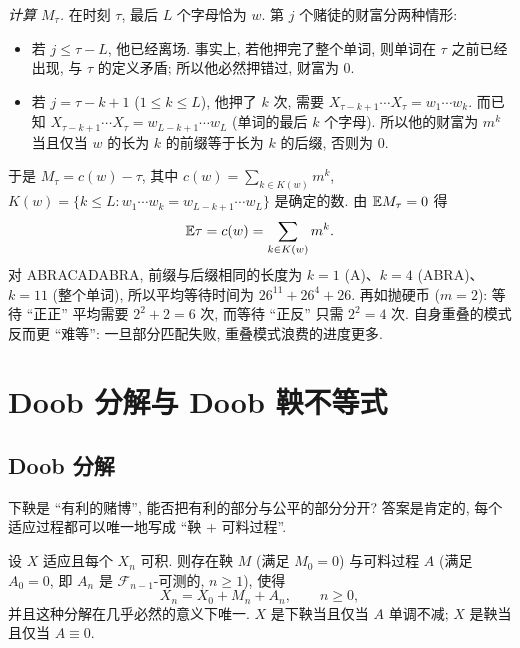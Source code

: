 \begin{example}[ABRACADABRA]
\emph{计算 $M_\tau$.} 在时刻 $\tau$, 最后 $L$ 个字母恰为 $w$. 第 $j$ 个赌徒的财富分两种情形:
\begin{itemize}
\item 若 $j\le\tau-L$, 他已经离场. 事实上, 若他押完了整个单词, 则单词在 $\tau$ 之前已经出现, 与 $\tau$ 的定义矛盾; 所以他必然押错过, 财富为 $0$.
\item 若 $j=\tau-k+1$ ($1\le k\le L$), 他押了 $k$ 次, 需要 $X_{\tau-k+1}\cdots X_\tau=w_1\cdots w_k$. 而已知 $X_{\tau-k+1}\cdots X_\tau=w_{L-k+1}\cdots w_L$ (单词的最后 $k$ 个字母). 所以他的财富为 $m^k$ 当且仅当 $w$ 的长为 $k$ 的前缀等于长为 $k$ 的后缀, 否则为 $0$.
\end{itemize}
于是 $M_\tau=c(w)-\tau$, 其中 $c(w)=\sum_{k\in K(w)}m^k$, $K(w)=\{k\le L: w_1\cdots w_k=w_{L-k+1}\cdots w_L\}$ 是确定的数. 由 $\mathbb{E} M_\tau=0$ 得
\[
\mathbb{E}\tau=c(w)=\sum_{k\in K(w)}m^k.
\]
对 ABRACADABRA, 前缀与后缀相同的长度为 $k=1$ (A)、$k=4$ (ABRA)、$k=11$ (整个单词), 所以平均等待时间为 $26^{11}+26^4+26$. 再如抛硬币 ($m=2$): 等待 ``正正'' 平均需要 $2^2+2=6$ 次, 而等待 ``正反'' 只需 $2^2=4$ 次. 自身重叠的模式反而更 ``难等'': 一旦部分匹配失败, 重叠模式浪费的进度更多.
\end{example}

\section{Doob 分解与 Doob 鞅不等式}
\label{sec:3-3}

\subsection{Doob 分解}

下鞅是 ``有利的赌博'', 能否把有利的部分与公平的部分分开? 答案是肯定的, 每个适应过程都可以唯一地写成 ``鞅 + 可料过程''.

\begin{theorem}[Doob 分解]\label{thm:doob-decomposition}
设 $X$ 适应且每个 $X_n$ 可积. 则存在鞅 $M$ (满足 $M_0=0$) 与可料过程 $A$ (满足 $A_0=0$, 即 $A_n$ 是 $\mathcal{F}_{n-1}$-可测的, $n\ge1$), 使得
\[
X_n=X_0+M_n+A_n,\qquad n\ge0,
\]
并且这种分解在几乎必然的意义下唯一. $X$ 是下鞅当且仅当 $A$ 单调不减; $X$ 是鞅当且仅当 $A\equiv0$.
\end{theorem}

